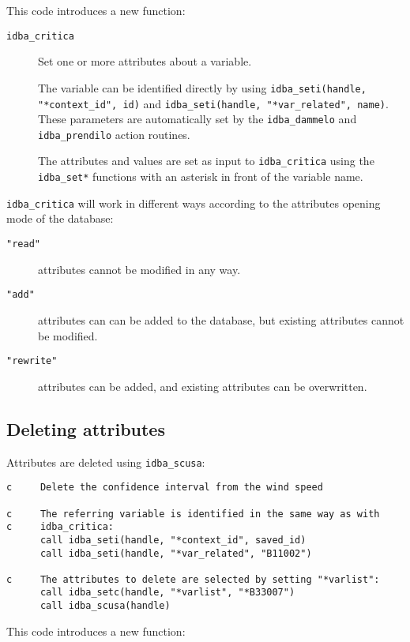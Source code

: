 \documentclass[final,12pt,a4paper,twoside]{book}
\begin{document}
This code introduces a new function:

\begin{description}
\item[{\tt idba\_critica}]
  Set one or more attributes about a variable.
  
  The variable can be identified directly by using {\tt idba\_seti(handle,
  "*context\_id", id)} and {\tt idba\_seti(handle, "*var\_related", name)}.
  These parameters are automatically set by the {\tt idba\_dammelo} and {\tt
  idba\_prendilo} action routines.

  The attributes and values are set as input to {\tt idba\_critica} using the
  {\tt idba\_set*} functions with an asterisk in front of the variable name.
\end{description}


{\tt idba\_critica} will work in different ways according to the attributes
opening mode of the database:

\begin{description}
\item[{\tt "read"}] attributes cannot be modified in any way.
\item[{\tt "add"}] attributes can can be added to the database, but existing
		   attributes cannot be modified.
\item[{\tt "rewrite"}] attributes can be added, and existing attributes can be
                   overwritten.
\end{description}


\subsection{Deleting attributes}

Attributes are deleted using {\tt idba\_scusa}:

\label{fun-idba_scusa}

\begin{verbatim}
c     Delete the confidence interval from the wind speed

c     The referring variable is identified in the same way as with
c     idba_critica:
      call idba_seti(handle, "*context_id", saved_id)
      call idba_seti(handle, "*var_related", "B11002")

c     The attributes to delete are selected by setting "*varlist":
      call idba_setc(handle, "*varlist", "*B33007")
      call idba_scusa(handle)
\end{verbatim}

This code introduces a new function:
\end{document}
